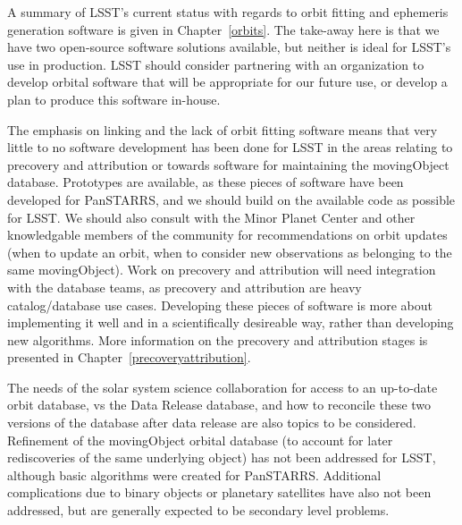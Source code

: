 A summary of LSST's current status with regards to orbit fitting and
ephemeris generation software is given in Chapter~\ref{orbits}. The
take-away here is that we have two open-source software solutions
available, but neither is ideal for LSST's use in production. LSST
should consider partnering with an organization to develop orbital
software that will be appropriate for our future use, or develop a plan to 
produce this software in-house.

The emphasis on linking and the lack of orbit fitting software means
that very little to no software development has been done for
LSST in the areas relating to precovery and attribution or towards
software for maintaining the movingObject database. Prototypes are available, as these pieces of
software have been developed for PanSTARRS, and we should build on the
available code as possible for LSST. We should also consult with the
Minor Planet Center and other knowledgable members of the community
for recommendations on orbit updates (when to update an orbit, when to
consider new observations as belonging to the same movingObject). Work
on precovery and attribution will need integration with
the database teams, as precovery and attribution are heavy
catalog/database use cases. Developing these pieces of software is more about
implementing it well and in a scientifically desireable way, rather than developing new algorithms. 
More information on the precovery and attribution stages is presented in
Chapter~\ref{precoveryattribution}. 

The needs of the solar system science collaboration for
access to an up-to-date orbit database, vs the Data Release database,
and how to reconcile these two versions of the database after data
release are also topics to be considered.  Refinement of the
movingObject orbital database (to account for later rediscoveries of
the same underlying object) has not been addressed for LSST, although
basic algorithms were created for PanSTARRS.  Additional complications
due to binary objects or planetary satellites have also not been
addressed, but are generally expected to be secondary level problems. 
